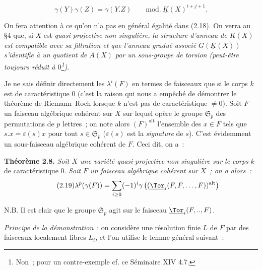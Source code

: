 \begin{equation}\tag{2.18}
 \gamma(Y)\gamma(Z)=\gamma(Y.Z)\qquad\mathrm{mod.}\ \underline K(X)^{i+j+1}.
\end{equation}

On
fera attention à ce qu'on n'a pas en général égalité dans (2.18). On verra au \S 4 que, si $X$ est \emph{quasi-projective non singulière, la structure d'anneau de $\underline K(X)$ est compatible avec sa filtration et que l'anneau gradué associé $G(\underline K(X))$ s'identifie à un quotient de $A(X)$ par un sous-groupe de torsion (peut-être toujours réduit à $0$\footnote{Non~; pour un contre-exemple cf. ce Séminaire XIV 4.7.})}.

Je ne sais définir directement les $\lambda^i(F)$ en termes de faisceaux que si le corps $k$ est de caractéristique $0$ (c'est la raison qui nous a empêché de démontrer le théorème de Riemann--Roch lorsque $k$ n'est pas de caractéristique $\neq0$). Soit $F$ un faisceau algébrique cohérent sur $X$ sur lequel opère le groupe $\mathfrak S_p$ des permutations de $p$ lettres~; on note alors $(F)^{\mathrm{alt}}$ l'ensemble des $x\in F$ tels que $s.x=\varepsilon(s)x$ pour tout $s\in\mathfrak S_p$ ($\varepsilon(s)$ est la \emph{signature} de $s$). C'est évidemment un sous-faisceau algébrique cohérent de $F$. Ceci dit, on a~:

\textbf{Théorème 2.8.} \emph{Soit $X$ une variété quasi-projective non singulière sur le corps} $k$ de caractéristique $0$. \emph{Soit $F$ un faisceau algébrique cohérent sur $X$~; on a alors~:}
\begin{equation}\tag{2.19}
 \lambda^p(\gamma(F))=\sum_{i\geq0}(-1)^i\gamma\left((\underline{\Tor}_i(F,F,\ldots,F))^{\mathrm{alt}}\right)
\end{equation}

N.B. Il est clair que le groupe $\mathfrak S_p$ agit sur le faisceau $\underline{\Tor}_i(F,..,F)$.

\emph{Principe de la démonstration}~: on considère une résolution finie $\underline L$ de $F$ par des faisceaux localement libres $L_i$, et l'on utilise le lemme général suivant~:

